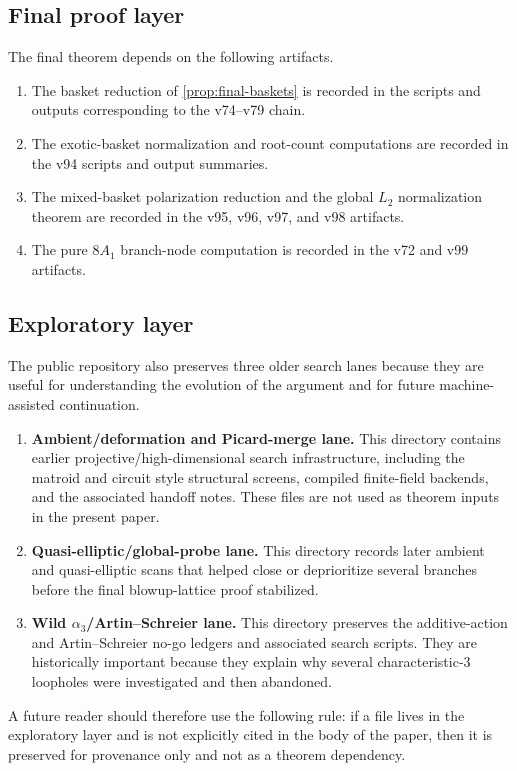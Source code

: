 \documentclass[11pt]{article}
\theoremstyle{definition}
\begin{document}
\subsection*{Final proof layer}
The final theorem depends on the following artifacts.
\begin{enumerate}[label=\textup{(\Alph*)}]
\item The basket reduction of \cref{prop:final-baskets} is recorded in the scripts and outputs corresponding to the v74--v79 chain.
\item The exotic-basket normalization and root-count computations are recorded in the v94 scripts and output summaries.
\item The mixed-basket polarization reduction and the global $L_2$ normalization theorem are recorded in the v95, v96, v97, and v98 artifacts.
\item The pure $8A_1$ branch-node computation is recorded in the v72 and v99 artifacts.
\end{enumerate}

\subsection*{Exploratory layer}
The public repository also preserves three older search lanes because they are useful for understanding the evolution of the argument and for future machine-assisted continuation.
\begin{enumerate}[label=\textup{(E\arabic*)}]
\item \textbf{Ambient/deformation and Picard-merge lane.} This directory contains earlier projective/high-dimensional search infrastructure, including the matroid and circuit style structural screens, compiled finite-field backends, and the associated handoff notes. These files are not used as theorem inputs in the present paper.
\item \textbf{Quasi-elliptic/global-probe lane.} This directory records later ambient and quasi-elliptic scans that helped close or deprioritize several branches before the final blowup-lattice proof stabilized.
\item \textbf{Wild $\alpha_3$/Artin--Schreier lane.} This directory preserves the additive-action and Artin--Schreier no-go ledgers and associated search scripts. They are historically important because they explain why several characteristic-$3$ loopholes were investigated and then abandoned.
\end{enumerate}

A future reader should therefore use the following rule: if a file lives in the exploratory layer and is not explicitly cited in the body of the paper, then it is preserved for provenance only and not as a theorem dependency.
\end{document}
